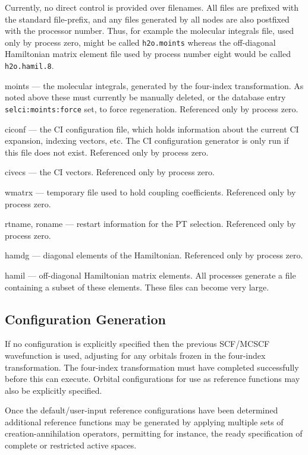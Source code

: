 Currently, no direct control is provided over filenames.  All files
are prefixed with the standard file-prefix, and any files generated by
all nodes are also postfixed with the processor number.  Thus, for
example the molecular integrals file, used only by process zero, might
be called {\tt h2o.moints} whereas the off-diagonal Hamiltonian matrix
element file used by process number eight would be called {\tt
  h2o.hamil.8}.

\begin{description}
\item{moints} --- the molecular integrals, generated by the four-index
  transformation.  As noted above these must currently be manually
  deleted, or the database entry \verb+selci:moints:force+ set, to
  force regeneration.  Referenced only by process zero.
\item{ciconf} --- the CI configuration file, which holds
  information about the current CI expansion, indexing vectors, etc.
  The CI configuration generator is only run if this file does not
  exist.  Referenced only by process zero.
\item{civecs} --- the CI vectors.    Referenced only by process zero.
\item{wmatrx} --- temporary file used to hold coupling coefficients.
  Referenced only by process zero.
\item{rtname, roname} --- restart information for the PT selection.
  Referenced only by process zero.
\item{hamdg} --- diagonal elements of the Hamiltonian.
  Referenced only by process zero.
\item{hamil} --- off-diagonal Hamiltonian matrix elements.  All
  processes generate a file containing a subset of these elements.
  These files can become very large.
\end{description}

\subsection{Configuration Generation}

If no configuration is explicitly specified then the previous
SCF/MCSCF wavefunction is used, adjusting for any orbitals frozen in
the four-index transformation.  The four-index transformation must
have completed successfully before this can execute.  Orbital
configurations for use as reference functions may also be explicitly
specified.

Once the default/user-input reference configurations have been
determined additional reference functions may be generated by applying
multiple sets of creation-annihilation operators, permitting for
instance, the ready specification of complete or restricted active
spaces.  

